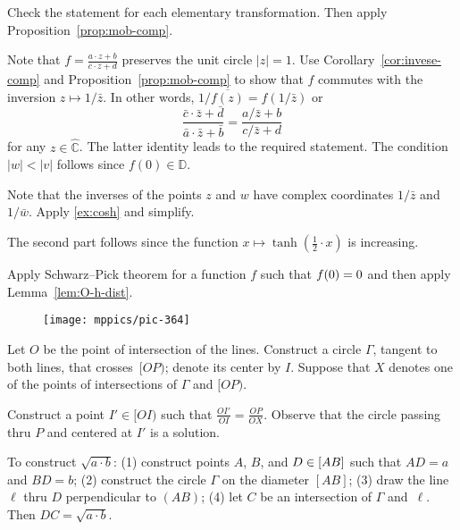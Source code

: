  
Check the statement for each elementary transformation.
Then apply Proposition~\ref{prop:mob-comp}.

Note that $f=\tfrac{a\cdot z+b}{c\cdot z+d}$ preserves the unit circle $|z|=1$.
Use Corollary~\ref{cor:invese-comp} and Proposition~\ref{prop:mob-comp} to show that $f$ commutes with the inversion $z\mapsto 1/\bar z$.
In other words, $1/\overline{f(z)}=f(1/\bar z)$ or
\[\frac{\bar c\cdot \bar z+\bar d}{\bar a\cdot \bar z+\bar b}
=\frac{a/\bar z+b}{c/\bar z+d}\]
for any $z\in\hat{\mathbb{C}}$.
The latter identity leads to the required statement. 
The condition $|w|<|v|$ follows since $f(0)\in\mathbb{D}$.

Note that the inverses of the points $z$ and $w$ have complex coordinates $1/\bar z$ and $1/\bar w$.
Apply \ref{ex:cosh} and simplify.

The second part follows since the function $x\mapsto \tanh(\tfrac12\cdot x)$ is increasing.

Apply Schwarz--Pick theorem for a function $f$ such that $f(0)\z=0$ and then apply Lemma~\ref{lem:O-h-dist}.

\setcounter{eqtn}{0}

{

\begin{wrapfigure}{r}{37mm}
\vskip-4mm
\centering
\texttt{[image: mppics/pic-364]}
\end{wrapfigure}

Let $O$ be the point of intersection of the lines.
Construct a circle $\Gamma$, tangent to both lines, that crosses~$[OP)$;
denote its center by $I$.
Suppose that $X$ denotes one of the points of intersections of $\Gamma$ and $[OP)$.

Construct a point $I'\in[OI)$ such that $\tfrac{OI'}{OI}=\tfrac{OP}{OX}$.
Observe that the circle passing thru $P$ and centered at $I'$ is a solution.

}

To construct  $\sqrt{a\cdot b}$:
(1) construct points $A$, $B$, and $D\z\in [AB]$
such that $AD=a$ and $BD=b$;
(2) construct the circle $\Gamma$ on the diameter $[AB]$;
(3) draw the line $\ell$ thru $D$ perpendicular to $(AB)$; 
(4) let $C$ be an intersection of $\Gamma$ and~$\ell$.
Then $DC= \sqrt{a\cdot b}$.

